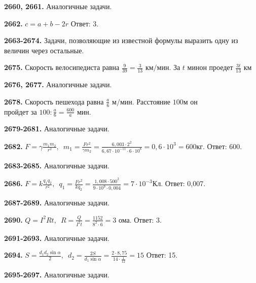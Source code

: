 \textbf{2660, 2661.} Аналогичные задачи.

\textbf{2662.} $c = a + b - 2r$\null \hspace*{\fill} Ответ: 3. 

\textbf{2663-2674.} Задачи, позволяющие из известной формулы выразить одну из величин через остальные.

\textbf{2675.} $\text{Скорость велосипедиста равна }\frac{9}{39}=\frac{3}{13}\text{ км/мин}. \text{ За } t \text{ мин}$\newline$\text{он проедет }\frac{3t}{13}\text{ км}$

\textbf{2676, 2677.} Аналогичные задачи.

\textbf{2678.} $\text{Скорость пешехода равна }\frac{a}{6}\text{ м/мин. Расстояние 100м он}$\newline$\text{пройдет за } 100 : \frac{a}{6}=\frac{600}{a}\text{ мин.}$

\textbf{2679-2681.} Аналогичные задачи.

\textbf{2682.} $F = \gamma\frac{m_1m_2}{r^2},\enspace m_1=\frac{Fr^2}{\gamma m_2}=\frac{6,003\cdot 2^2}{6,67 \cdot 10^{-11} \cdot 6 \cdot 10^8}= 0,6\cdot 10^3 = 600\text{кг}.$\newline \null \hspace*{\fill} Ответ: 600. 

\textbf{2683-2685.} Аналогичные задачи.

\textbf{2686.} $F = k\frac{q_1q_2}{r^2},\enspace q_1=\frac{Fr^2}{kq_2}=\frac{1,008\cdot 500^2}{9\cdot 10^9\cdot 0,004}=7\cdot 10^{-3}\text{Кл}.$ \newline \null \hspace*{\fill} Ответ: 0,007. 

\textbf{2687-2689.} Аналогичные задачи.

\textbf{2690.} $Q = I^2Rt,\enspace R=\frac{Q}{I^2t}=\frac{1152}{8^2\cdot 6}= 3 \text{ ома}.$ \newline \null \hspace*{\fill} Ответ: 3. 

\textbf{2691-2693.} Аналогичные задачи.

\textbf{2694.} $S=\frac{d_1d_2\sin\alpha}{2},\enspace d_2=\frac{2S}{d_1\sin\alpha}=\frac{2\cdot 8,75}{14\cdot \frac{1}{12}}=15$ \newline \null \hspace*{\fill} Ответ: 15. 

\textbf{2695-2697.} Аналогичные задачи.

